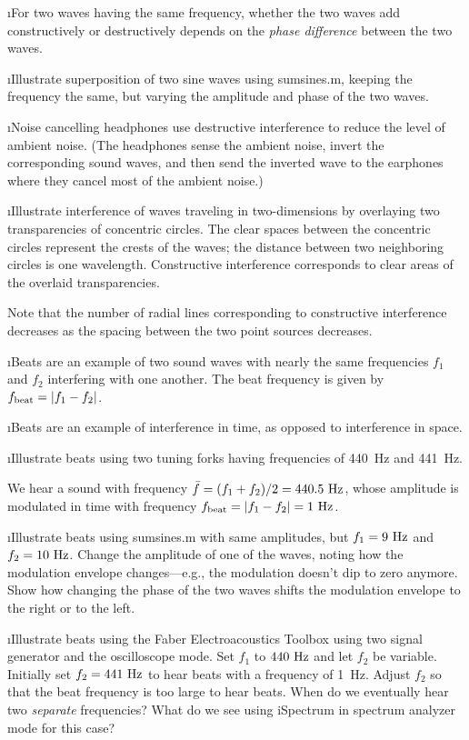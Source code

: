 \i For two waves having the same frequency, whether the two
waves add constructively or destructively depends on the
{\em phase difference} between the two waves.

\i \demo Illustrate superposition of two sine waves using sumsines.m,
keeping the frequency the same, but varying the amplitude and 
phase of the two waves.

\i \ex Noise cancelling headphones use destructive interference 
to reduce the level of ambient noise.
(The headphones sense the ambient noise, invert the corresponding
sound waves, and then send the inverted wave to the earphones where 
they cancel most of the ambient noise.)

\i \demo Illustrate interference of waves traveling in two-dimensions
by overlaying two transparencies of concentric circles.
The clear spaces between the concentric circles represent the crests 
of the waves; the distance between two neighboring 
circles is one wavelength.
Constructive interference corresponds to clear areas of the overlaid 
transparencies.

Note that the number of radial lines corresponding to 
constructive interference decreases as the spacing between the two 
point sources decreases.

\i Beats are an example of two sound waves with nearly
the same frequencies $f_1$ and $f_2$ interfering with
one another.
The beat frequency is given by $f_{\rm beat} = |f_1-f_2|$.

\i Beats are an example of interference in time, as opposed to 
interference in space.

\i \demo Illustrate beats using two tuning forks having
frequencies of 440~Hz and 441~Hz.

We hear a sound with frequency 
$\bar f =(f_1+f_2)/2= 440.5~{\rm Hz}$, whose amplitude is 
modulated in time with frequency $f_{\rm beat}=|f_1-f_2|=1~{\rm Hz}$.

\i \demo Illustrate beats using sumsines.m
with same amplitudes, but $f_1=9~{\rm Hz}$ and $f_2=10~{\rm Hz}$.
Change the amplitude of one of the waves, noting how the 
modulation envelope changes---e.g., the modulation doesn't dip to
zero anymore.
Show how changing the phase of the two waves shifts the modulation
envelope to the right or to the left.

\i \demo Illustrate beats using the Faber Electroacoustics Toolbox
using two signal generator and the oscilloscope mode.
Set $f_1$ to $440~{\rm Hz}$ and let $f_2$ be variable.
Initially set $f_2=441~{\rm Hz}$ to hear beats with a frequency
of 1~Hz.
Adjust $f_2$ so that the beat frequency is too large to hear beats.
When do we eventually hear two {\em separate} frequencies?
What do we see using iSpectrum in spectrum analyzer mode for this case?

